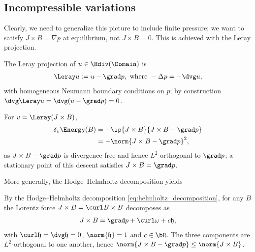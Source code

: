 \documentclass[%
 reprint,
 superscriptaddress,
 amsmath,amssymb,
 aps, nofootinbib, floatfix]{revtex4-2}
\begin{document}
\subsection{Incompressible variations}
\label{sec:incompressible_variations}
Clearly, we need to generalize this picture to include finite pressure; we want to satisfy $J\times B = \nabla p$ at equilibrium, not $J \times B = 0$. This is achieved with the Leray projection.

\begin{definition}
    \label{def:leray}
    The Leray projection of $u \in \Hdiv(\Domain)$ is
\begin{align}
\label{eq:elliptic_pressure_problem}
    \Leray u := u - \grad p, \text{ where } - \Delta p = - \dvg u,
\end{align}
    with homogeneous Neumann boundary conditions on $p$; by construction $\dvg \Leray u = \dvg (u - \grad p) = 0$.
\end{definition}

\begin{corollary}
    \label{cor:force_balance}
    For $v = \Leray (J \times B)$,
\begin{align}
    \delta_v \Energy(B)
    &= -\ip{J \times B}{J \times B - \grad p} \\
\label{eq:force_balance_deltaE}
    &= - \norm{J \times B - \grad p}^2 ,
\end{align}
    as $J \times B - \grad p$ is divergence-free and hence $L^2$-orthogonal to $\grad p$; a stationary point of this descent satisfies $J \times B = \grad p$.
\end{corollary}

More generally, the Hodge--Helmholtz decomposition yields

\begin{corollary}
    \label{cor:force_decomposition}
    By the Hodge--Helmholtz decomposition \eqref{eq:helmholtz_decomposition}, for any $B$ the Lorentz force $J \times B = \curl B \times B$ decomposes as
\begin{align}
    \label{eq:force_decomposition}
    J \times B = \grad p + \curl \omega + c \mathfrak h,
\end{align}
    with $\curl \mathfrak h = \dvg \mathfrak h = 0$, $\norm{\mathfrak h} = 1$ and $c \in \bR$. The three components are $L^2$-orthogonal to one another, hence $\norm{J \times B - \grad p} \leq \norm{J \times B}$.
\end{corollary}
\end{document}
